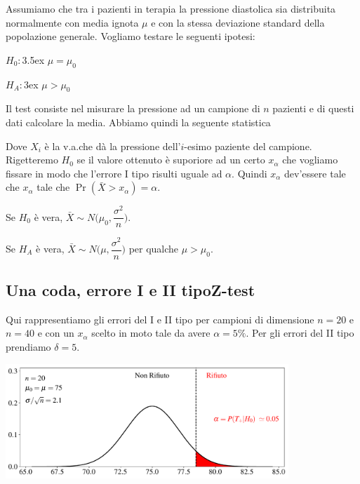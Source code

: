 \documentclass[12pt,openany]{book}
\theoremstyle{mio}
\theoremstyle{liscio}
\begin{document}
Assumiamo che tra i pazienti in terapia la pressione diastolica sia distribuita normalmente con media ignota $\mu$ e con la stessa deviazione standard della popolazione generale. Vogliamo testare le seguenti ipotesi:

$H_0:$\kern3.5ex $\mu=\mu_0$

$H_A:$\kern3ex $\mu>\mu_0$

Il test consiste nel misurare la pressione ad un campione di $n$ pazienti e di questi dati calcolare la media. Abbiamo quindi la seguente statistica


Dove $X_i$ è la v.a.\@ che dà la pressione dell'$i$-esimo paziente del campione. Rigetteremo $H_0$ se il
valore ottenuto è suporiore ad un certo $x_\alpha$ che vogliamo fissare in modo che l'errore I tipo risulti uguale ad $\alpha$. Quindi $x_\alpha$ dev'essere tale che $x_\alpha$ tale che $\Pr(\bar X>x_\alpha)=\alpha$.

Se $H_0$ è vera, $\bar X\sim N\bigg(\mu_0,\dfrac{\sigma^2}{n}\bigg)$.

Se $H_A$ è vera, $\bar X\sim N\bigg(\mu,\dfrac{\sigma^2}{n}\bigg)$ per qualche $\mu>\mu_0$.

% 



\hfill{}\clearpage\subsection{Una coda, errore I e II tipo\hfill Z-test}


Qui rappresentiamo gli errori del I e II tipo per campioni di dimensione $n=20$ e $n= 40$ e con un $x_\alpha$ scelto in moto tale da avere $\alpha=5\%$. Per gli errori del II tipo prendiamo $\delta=5$.

\hfil\includegraphics[width=0.8\textwidth]{figure/Z-test_01.pdf}
\end{document}
